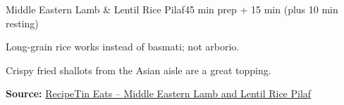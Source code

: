 \begin{recipebox}{Middle Eastern Lamb \& Lentil Rice Pilaf}{4}{5 min prep + 15 min (plus 10 min resting)}
\begin{notelist}
  \item Long-grain rice works instead of basmati; not arborio.
  \item Crispy fried shallots from the Asian aisle are a great topping.
\end{notelist}

\noindent\textbf{Source:} \href{https://www.recipetineats.com/middle-eastern-lamb-lentil-rice-pilaf/}{RecipeTin Eats -- Middle Eastern Lamb and Lentil Rice Pilaf}

\end{recipebox}
